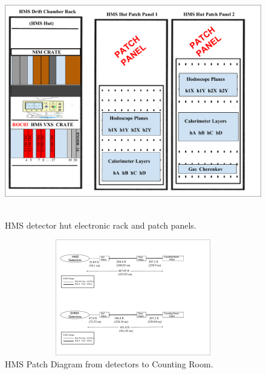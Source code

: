\documentclass[11pt]{article}
\begin{document}
\begin{figure}[h!]
  \centering
  \includegraphics[width=5.0in, height=4.0in]{images/HMS_Hut_Rack.pdf}
  \caption{HMS detector hut electronic rack and patch panels.}
  \label{fig:hms_hut_rack}
\end{figure}

\begin{figure}[h]
  \centering
  \includegraphics[width=6.0in, height=2.0in]{images/HMS_patch.pdf}
  \caption{HMS Patch Diagram from detectors to Counting Room.}
  \label{fig:hms_patch}
\end{figure}
\end{document}
